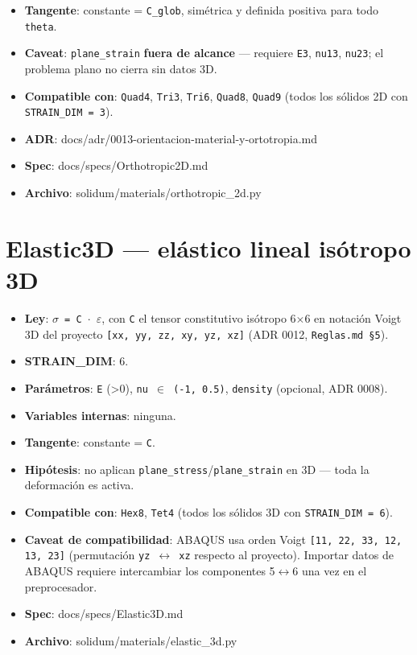 \documentclass[11pt,letterpaper,oneside]{report}
\begin{document}
\begin{itemize}
  \item \textbf{Tangente}: constante = \texttt{C\_glob}, simétrica y definida positiva para todo \texttt{theta}.
  \item \textbf{Caveat}: \texttt{plane\_strain} \textbf{fuera de alcance} --- requiere \texttt{E3}, \texttt{nu13}, \texttt{nu23}; el problema plano no cierra sin datos 3D.
  \item \textbf{Compatible con}: \texttt{Quad4}, \texttt{Tri3}, \texttt{Tri6}, \texttt{Quad8}, \texttt{Quad9} (todos los sólidos 2D con \texttt{STRAIN\_DIM = 3}).
  \item \textbf{ADR}: docs/adr/0013-orientacion-material-y-ortotropia.md
  \item \textbf{Spec}: docs/specs/Orthotropic2D.md
  \item \textbf{Archivo}: solidum/materials/orthotropic\_2d.py
\end{itemize}


\section{Elastic3D --- elástico lineal isótropo 3D}

\begin{itemize}
  \item \textbf{Ley}: \texttt{\ensuremath{\sigma} = C \ensuremath{\cdot} \ensuremath{\varepsilon}}, con \texttt{C} el tensor constitutivo isótropo 6\ensuremath{\times}6 en notación Voigt 3D del proyecto \texttt{[xx, yy, zz, xy, yz, xz]} (ADR 0012, \texttt{Reglas.md §5}).
  \item \textbf{STRAIN\_DIM}: 6.
  \item \textbf{Parámetros}: \texttt{E} (>0), \texttt{nu \ensuremath{\in} (-1, 0.5)}, \texttt{density} (opcional, ADR 0008).
  \item \textbf{Variables internas}: ninguna.
  \item \textbf{Tangente}: constante = \texttt{C}.
  \item \textbf{Hipótesis}: no aplican \texttt{plane\_stress}/\texttt{plane\_strain} en 3D --- toda la deformación es activa.
  \item \textbf{Compatible con}: \texttt{Hex8}, \texttt{Tet4} (todos los sólidos 3D con \texttt{STRAIN\_DIM = 6}).
  \item \textbf{Caveat de compatibilidad}: ABAQUS usa orden Voigt \texttt{[11, 22, 33, 12, 13, 23]} (permutación \texttt{yz \ensuremath{\leftrightarrow} xz} respecto al proyecto). Importar datos de ABAQUS requiere intercambiar los componentes 5\ensuremath{\leftrightarrow}6 una vez en el preprocesador.
  \item \textbf{Spec}: docs/specs/Elastic3D.md
  \item \textbf{Archivo}: solidum/materials/elastic\_3d.py
\end{itemize}
\end{document}
